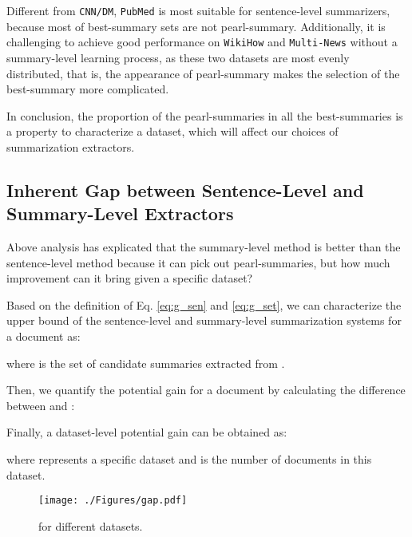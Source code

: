 \documentclass[11pt,a4paper]{article}
\begin{document}
Different from \texttt{CNN/DM}, \texttt{PubMed} is most suitable for sentence-level summarizers, because most of best-summary sets are not pearl-summary.
Additionally, it is challenging to achieve good performance on \texttt{WikiHow} and \texttt{Multi-News} without a summary-level learning process, as these two datasets are most evenly distributed, that is, the appearance of pearl-summary makes the selection of the best-summary more complicated.

In conclusion, the proportion of the pearl-summaries in all the best-summaries is a property to characterize a dataset, which will affect our choices of summarization extractors.





\subsection{Inherent Gap between Sentence-Level and Summary-Level Extractors}
\label{sec:inherent gap}
Above analysis has explicated that the summary-level method is better than the sentence-level method because it can pick out pearl-summaries, but how much improvement can it bring given a specific dataset?


Based on the definition of Eq. \eqref{eq:g_sen} and \eqref{eq:g_set}, we can characterize the upper bound of the sentence-level and summary-level summarization systems for a document  as:



where  is the set of candidate summaries extracted from .



Then, we quantify the potential gain for a document   by calculating the difference between  and :

Finally, a dataset-level potential gain can be obtained as:

where  represents a specific dataset and  is the number of documents in this dataset.

\begin{figure}[t]
    \centering
    \texttt{[image: ./Figures/gap.pdf]}
    \caption{ for different datasets.}
    \label{fig:delta}
\end{figure}
\end{document}
